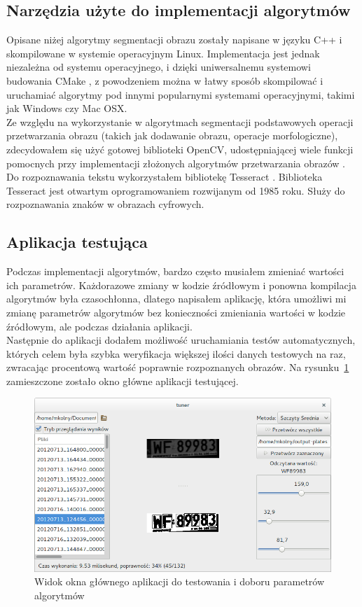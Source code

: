 \subsection{Narzędzia użyte do implementacji algorytmów}
Opisane niżej algorytmy segmentacji obrazu zostały napisane w języku C++ i skompilowane w systemie operacyjnym Linux. Implementacja jest jednak niezależna od systemu operacyjnego, i dzięki uniwersalnemu systemowi budowania CMake \cite{cmake}, z powodzeniem można w łatwy sposób skompilować i uruchamiać algorytmy pod innymi popularnymi systemami operacyjnymi, takimi jak Windows czy Mac OSX.\\
Ze względu na wykorzystanie w algorytmach segmentacji podstawowych operacji przetwarzania obrazu (takich jak dodawanie obrazu, operacje morfologiczne), zdecydowałem się użyć gotowej biblioteki OpenCV, udostępniającej wiele funkcji pomocnych przy implementacji złożonych algorytmów przetwarzania obrazów \cite{opencv}\cite{dawsonhowe14}.\\
Do rozpoznawania tekstu wykorzystałem bibliotekę Tesseract \cite{tesseract}. Biblioteka Tesseract jest otwartym oprogramowaniem rozwijanym od 1985 roku. Służy do rozpoznawania znaków w obrazach cyfrowych.
\subsection{Aplikacja testująca}
Podczas implementacji algorytmów, bardzo często musiałem zmieniać wartości ich parametrów. Każdorazowe zmiany w kodzie źródłowym i ponowna kompilacja algorytmów była czasochłonna, dlatego napisałem aplikację, która umożliwi mi zmianę parametrów algorytmów bez konieczności zmieniania wartości w kodzie źródłowym, ale podczas działania aplikacji.\\
Następnie do aplikacji dodałem możliwość uruchamiania testów automatycznych, których celem była szybka weryfikacja większej ilości danych testowych na raz, zwracając procentową wartość poprawnie rozpoznanych obrazów. Na rysunku~\ref{fig:tuner_screenshot} zamieszczone zostało okno główne aplikacji testującej.

\begin{figure}
  \centering
  \includegraphics[width=1\textwidth]{img/tuner-screenshot}
  \caption{Widok okna głównego aplikacji do testowania i doboru parametrów algorytmów}
  \label{fig:tuner_screenshot}
\end{figure}

